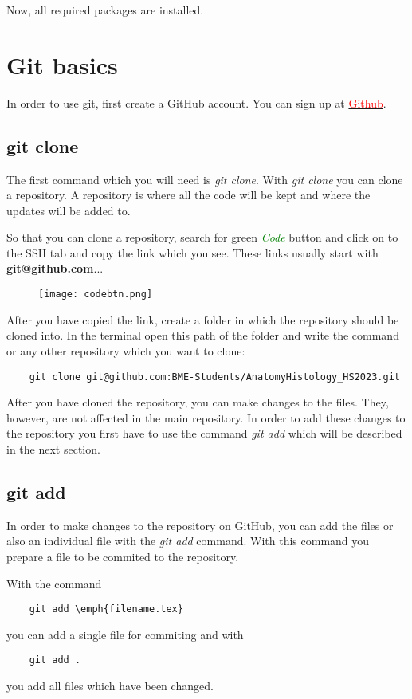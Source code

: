 \documentclass[
	a4paper, %
	10pt, %
	unnumberedsections, %
	twoside, %
	onecolumn,
]{LTJournalArticle}
\begin{document}
Now, all required packages are installed.

\section{Git basics}
In order to use git, first create a GitHub account. You can sign up at \href{https://github.com}{\textcolor{red}{Github}}.
\subsection{git clone}
The first command which you will need is \emph{git clone}. With \emph{git clone} you can clone a repository. A repository is where all the code will be kept and where the updates will be added to. 

So that you can clone a repository, search for green \emph{\textcolor{green}{Code}} button and click on to the SSH tab and copy the link which you see. These links usually start with \textbf{git@github.com}...
\begin{figure}[h!]
	\centering
	\texttt{[image: codebtn.png]}
\end{figure}

After you have copied the link, create a folder in which the repository should be cloned into. 
In the terminal open this path of the folder and write the command or any other repository which you want to clone:
\begin{verbatim}
	git clone git@github.com:BME-Students/AnatomyHistology_HS2023.git
\end{verbatim}

After you have cloned the repository, you can make changes to the files. They, however, are not affected in the main repository. In order to add these changes to the repository you first have to use the command \emph{git add} which will be described in the next section.

\subsection{git add}
In order to make changes to the repository on GitHub, you can add the files or also an individual file with the \emph{git add} command. With this command you prepare a file to be commited to the repository. 

With the command 
\begin{verbatim}
	git add \emph{filename.tex}
\end{verbatim}
you can add a single file for commiting and with
\begin{verbatim}
	git add .
\end{verbatim}
you add all files which have been changed.
\end{document}
